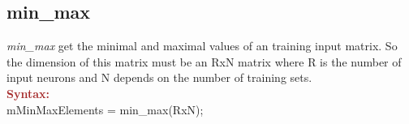 \subsection{min\_max}
\textit{min\_max} get the minimal and maximal values of an training input matrix. So the dimension of this matrix must be an RxN matrix where R is the number of input neurons and N depends on the number of training sets.\\

\noindent \textbf{\textcolor{brown}{Syntax:}}\\

\noindent mMinMaxElements = min\_max(RxN);\\




